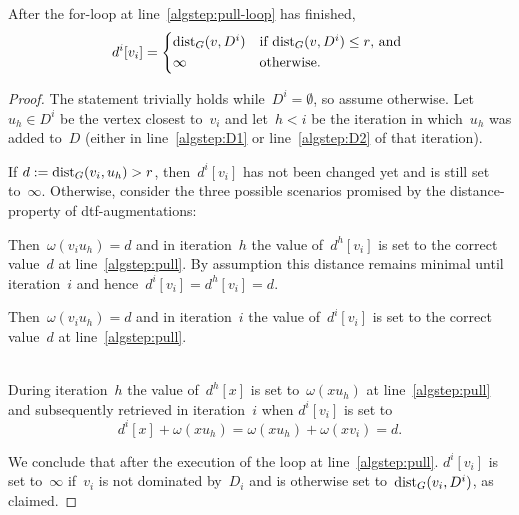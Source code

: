 \begin{lemma}
  After the for-loop at line~\ref{algstep:pull-loop} has finished,
  \[
    d^i[v_i] = \begin{cases*}
      \dist_G(v,D^i) & if $\dist_G(v,D^i) \leq r$, and \\
      \infty & otherwise.
    \end{cases*}
  \]
\end{lemma}
\begin{proof}
  The statement trivially holds while~$D^i = \emptyset$, so assume otherwise.
  Let~$u_h \in D^i$ be the vertex closest to~$v_i$ and let~$h < i$
  be the iteration in which~$u_h$ was added to~$D$ (either in
  line~\ref{algstep:D1} or line~\ref{algstep:D2} of that iteration).

  If $d := \text{dist}_G(v_i,u_h) > r$,
  then~$d^i[v_i]$ has not been changed yet and is still set to~$\infty$.
  Otherwise, consider the three possible scenarios promised by the
  distance-property of dtf-augmentations:

  \begin{case}[$v_iu_h \in \dir G_d$]
    Then~$\omega(v_iu_h) = d$ and in iteration~$h$
    the value of~$d^h[v_i]$ is set to the correct value~$d$
    at line~\ref{algstep:pull}.
    By assumption this distance remains minimal until iteration~$i$
    and hence~$d^i[v_i] = d^h[v_i] = d$.
  \end{case}

  \begin{case}[$u_hv_i \in \dir G_d$]
    Then~$\omega(v_iu_h) = d$ and in iteration~$i$
    the value of~$d^i[v_i]$ is set to the correct value~$d$
    at line~\ref{algstep:pull}.
  \end{case}

  \def\ww#1{\omega(#1)}
  \begin{case}[$xu_h,xv_i \in \dir G_d$  with~$\ww{xu_h} + \ww{xv_i} = d$]\mbox{}\\
    During iteration~$h$ the value of~$d^h[x]$ is set to~$\ww{xu_h}$
    at line~\ref{algstep:pull} and subsequently retrieved
    in iteration~$i$ when $d^i[v_i]$ is set to
    \[
      d^i[x] + \ww{xu_h} = \ww{xu_h} + \ww{xv_i} = d.
    \]
    \vspace*{-1.5em}
  \end{case}
  \noindent
  We conclude that after the execution of the loop at line~\ref{algstep:pull}.
  $d^i[v_i]$ is set to~$\infty$ if~$v_i$ is not dominated by~$D_i$ and is
  otherwise set to~$\text{dist}_G(v_i,D^i)$, as claimed.
\end{proof}

